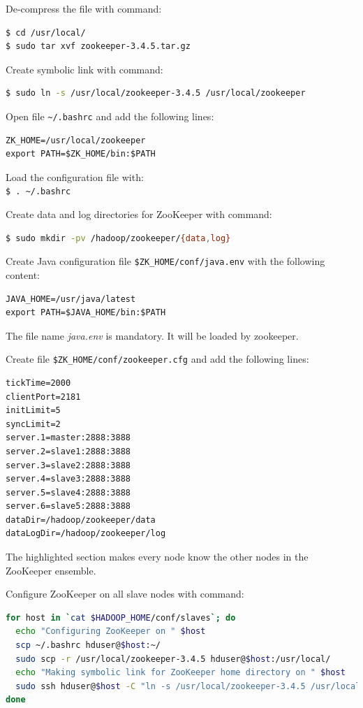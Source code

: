 De-compress the file with command:
\lstset{style=bashstyle}
\begin{lstlisting}[language=bash]
$ cd /usr/local/
$ sudo tar xvf zookeeper-3.4.5.tar.gz
\end{lstlisting}

Create symbolic link with command:
\lstset{style=bashstyle}
\begin{lstlisting}[language=bash]
$ sudo ln -s /usr/local/zookeeper-3.4.5 /usr/local/zookeeper
\end{lstlisting}

Open file \verb|~/.bashrc| and add the following lines: 
\lstset{style=bashstyle}
\begin{lstlisting}
ZK_HOME=/usr/local/zookeeper
export PATH=$ZK_HOME/bin:$PATH
\end{lstlisting}

Load the configuration file with: \\
\verb|$ . ~/.bashrc|

Create data and log directories for ZooKeeper with command:
\lstset{style=bashstyle}
\begin{lstlisting}[language=bash]
$ sudo mkdir -pv /hadoop/zookeeper/{data,log}
\end{lstlisting}

Create Java configuration file \verb|$ZK_HOME/conf/java.env| with the following content:
\lstset{style=bashstyle}
\begin{lstlisting}
JAVA_HOME=/usr/java/latest
export PATH=$JAVA_HOME/bin:$PATH
\end{lstlisting}

The file name \emph{java.env} is mandatory. It will be loaded by zookeeper.

Create file \verb|$ZK_HOME/conf/zookeeper.cfg| and add the following lines:
\lstset{style=bashstyle}
\begin{lstlisting}
tickTime=2000
clientPort=2181
initLimit=5
syncLimit=2
server.1=master:2888:3888
server.2=slave1:2888:3888
server.3=slave2:2888:3888
server.4=slave3:2888:3888
server.5=slave4:2888:3888
server.6=slave5:2888:3888
dataDir=/hadoop/zookeeper/data
dataLogDir=/hadoop/zookeeper/log
\end{lstlisting}

The highlighted section makes every node know the other nodes in the ZooKeeper ensemble.

Configure ZooKeeper on all slave nodes with command:
\lstset{style=bashstyle}
\begin{lstlisting}[language=bash]
for host in `cat $HADOOP_HOME/conf/slaves`; do
  echo "Configuring ZooKeeper on " $host
  scp ~/.bashrc hduser@$host:~/
  sudo scp -r /usr/local/zookeeper-3.4.5 hduser@$host:/usr/local/
  echo "Making symbolic link for ZooKeeper home directory on " $host
  sudo ssh hduser@$host -C "ln -s /usr/local/zookeeper-3.4.5 /usr/local/zookeeper"
done
\end{lstlisting}

